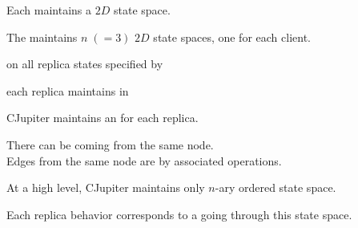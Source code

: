 \begin{frame}{}
  \centerline{\large Each  maintains a $2D$ state space.}


  \centerline{\large The  maintains $n \; (=3)$ $2D$ state spaces, one for each client.}
\end{frame}

\begin{frame}{}
  \begin{center}
    {\large {} on all replica states specified by \blue{\wlspec{}}}

    \vspace{0.20cm}
    \vspace{0.20cm}

    {\large {} each replica maintains in }
  \end{center}
\end{frame}

\begin{frame}{}
  \begin{center}
    {\large CJupiter maintains an  for each replica.}
  \end{center}


  \begin{center} 
    There can be  coming from the same node. \\[5pt]
    Edges from the same node are  by associated operations.
  \end{center}
\end{frame}

\begin{frame}{}
  \begin{center}
    \begin{prop}
      {\large At a high level, CJupiter maintains only  $n$-ary ordered state space.}
    \end{prop}

    \vspace{0.20cm}

    \vspace{0.20cm}
    Each replica behavior corresponds to a  going through this state space.
  \end{center}
\end{frame}

